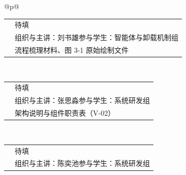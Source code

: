 \begin{longtable}{@{}p{\linewidth}@{}}
\begin{minipage}{\linewidth}
\begin{tabular}{@{}>{\raggedright\arraybackslash}p{}>{\raggedright\arraybackslash}p{}@{}}
\hline
\rowcolor{WordTableHeader}\multicolumn{2}{@{}p{\linewidth}@{}}{\RecordHeading{编号：T-03\quad 活动主题：智能体执行流程与工具调用机制：大模型与工具的交替执行}} \\ \hline
\rowcolor{white} \TableHeaderText{时间} & 待填 \\ \hline
\rowcolor{white} \TableHeaderText{组织与参与} & 组织与主讲：刘书雄\newline 参与学生：智能体与卸载机制组 \\ \hline
\rowcolor{white} \TableHeaderText{形成材料} & 流程梳理材料、图 3-1 原始绘制文件 \\ \hline
\end{tabular}
\end{minipage} \\[6pt]
\begin{minipage}{\linewidth}
\begin{tabular}{@{}>{\raggedright\arraybackslash}p{}>{\raggedright\arraybackslash}p{}@{}}
\hline
\rowcolor{WordTableHeader}\multicolumn{2}{@{}p{\linewidth}@{}}{\RecordHeading{编号：T-04\quad 活动主题：用户态内核与运行时扁平化设计方法}} \\ \hline
\rowcolor{white} \TableHeaderText{时间} & 待填 \\ \hline
\rowcolor{white} \TableHeaderText{组织与参与} & 组织与主讲：张思淼\newline 参与学生：系统研发组 \\ \hline
\rowcolor{white} \TableHeaderText{形成材料} & 架构说明与组件职责表（V-02） \\ \hline
\end{tabular}
\end{minipage} \\[6pt]
\begin{minipage}{\linewidth}
\begin{tabular}{@{}>{\raggedright\arraybackslash}p{}>{\raggedright\arraybackslash}p{}@{}}
\hline
\rowcolor{WordTableHeader}\multicolumn{2}{@{}p{\linewidth}@{}}{\RecordHeading{编号：T-05\quad 活动主题：检查点与恢复机制原理：CRIU、缺页异常与预取}} \\ \hline
\rowcolor{white} \TableHeaderText{时间} & 待填 \\ \hline
\rowcolor{white} \TableHeaderText{组织与参与} & 组织与主讲：陈奕池\newline 参与学生：系统研发组 \\ \hline

\end{tabular}
\end{minipage}
\end{longtable}
